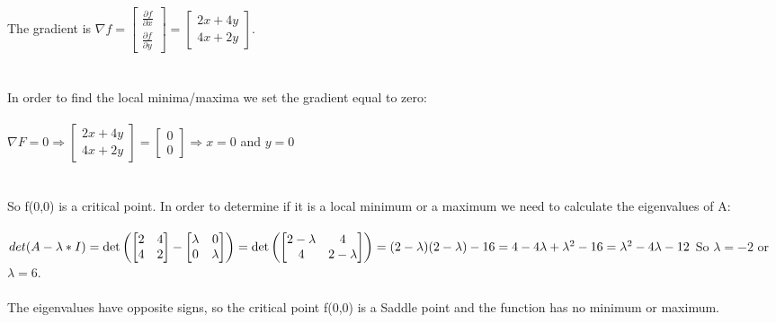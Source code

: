\documentclass{article}
\begin{document}
  \noindent \\ The gradient is $\nabla f=
  \begin{bmatrix}
    \frac{\partial f}{\partial x} \\
    \frac{\partial f}{\partial y}
  \end{bmatrix} =
  \begin{bmatrix}
    2x+4y \\
    4x+2y
  \end{bmatrix}
  $. \\\\ \\In order to find the local minima/maxima we set the gradient equal to zero: \\ \\$\nabla F=0 \Rightarrow 
  \begin{bmatrix}
    2x+4y \\
    4x+2y
  \end{bmatrix} =
  \begin{bmatrix}
    0 \\ 0
  \end{bmatrix} \Rightarrow x=0$ and $y=0
  $\\ \\ \\
  So f(0,0) is a critical point. In order to determine if it is a local minimum or a maximum we need to calculate the eigenvalues of A:\\ \\
  ${det(A - \lambda*I)} = \det \left ( \begin{bmatrix}
    2 & 4 \\
    4 & 2
  \end{bmatrix} 
  -\begin{bmatrix}
    \lambda & 0 \\
    0 & \lambda
  \end{bmatrix} \right )  = 
  \det \left (\begin{bmatrix}
    2-\lambda & 4 \\
    4 & 2-\lambda
\end{bmatrix} \right ) = (2-\lambda)(2-\lambda)-16=\\ \\4-4\lambda+\lambda^2-16=\lambda^2-4\lambda-12$ 
So $\lambda = -2 $ or $\lambda = 6$. \\ \\
The eigenvalues have opposite signs, so the critical point f(0,0) is a Saddle point and the function has no minimum or maximum.
\end{document}

